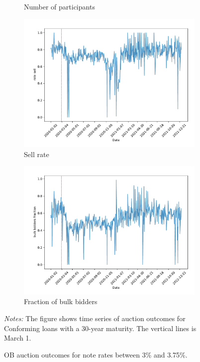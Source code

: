 \documentclass[11pt,a4paper]{article}
\begin{document}
\begin{figure}[h]
\begin{subfigure}[b]{0.49\textwidth}
      \caption{ Number of participants}
     \end{subfigure}
     \begin{subfigure}[b]{0.49\textwidth}
      \includegraphics[width=0.998\textwidth]{../results/figures/dummy_sell_any_mean_mat30_loan1_timeseries_nr_3_3.75.pdf}
      \caption{ Sell rate}
     \end{subfigure}
     \begin{subfigure}[b]{0.49\textwidth}
      \includegraphics[width=0.998\textwidth]{../results/figures/bulk_bidders_fraction_mean_mat30_loan1_timeseries_nr_3_3.75.pdf}
      \caption{ Fraction of bulk bidders}
     \end{subfigure}
     \caption{OB auction outcomes for note rates between 3\% and 3.75\%.  } 
   \begin{minipage}{\textwidth}
      \footnotesize{\textit{Notes:} The figure shows time series of auction outcomes for Conforming loans with a 30-year maturity. The vertical lines is March 1.  } 
      \end{minipage}
\end{figure}
\end{document}
